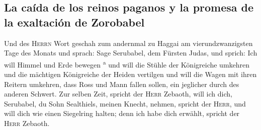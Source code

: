 \hypertarget{la-cauxedda-de-los-reinos-paganos-y-la-promesa-de-la-exaltaciuxf3n-de-zorobabel}{%
\subsection{La caída de los reinos paganos y la promesa de la exaltación
de
Zorobabel}\label{la-cauxedda-de-los-reinos-paganos-y-la-promesa-de-la-exaltaciuxf3n-de-zorobabel}}

 Und des \textsc{Herrn} Wort geschah zum andernmal zu
Haggai am vierundzwanzigsten Tage des Monats und sprach: 
Sage Serubabel, dem Fürsten Judas, und sprich: Ich will Himmel und Erde
bewegen \textsuperscript{a}  und will die Stühle der
Königreiche umkehren und die mächtigen Königreiche der Heiden vertilgen
und will die Wagen mit ihren Reitern umkehren, dass Ross und Mann fallen
sollen, ein jeglicher durch des anderen Schwert.  Zur
selben Zeit, spricht der \textsc{Herr} Zebaoth, will ich dich,
Serubabel, du Sohn Sealthiels, meinen Knecht, nehmen, spricht der
\textsc{Herr}, und will dich wie einen Siegelring halten; denn ich habe
dich erwählt, spricht der \textsc{Herr} Zebaoth.
